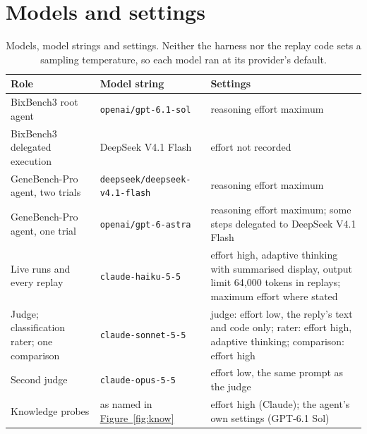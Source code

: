 \documentclass[10pt]{article}
\newcommand{\figref}[1]{\hyperref[#1]{Figure~\ref*{#1}}}
\begin{document}
\section{Models and settings}\label{app:models}
\begin{table}[H]
\centering\small
\caption{Models, model strings and settings. Neither the harness nor the replay code sets a sampling temperature, so each model ran at its provider's default.}
\label{tab:models}
\begin{tabularx}{\textwidth}{@{}P{3.8cm}P{4.0cm}L@{}}
\toprule
Role & Model string & Settings\\
\midrule
BixBench3 root agent & \texttt{openai/gpt-6.1-sol} & reasoning effort maximum\\
BixBench3 delegated execution & DeepSeek V4.1 Flash & effort not recorded\\
GeneBench-Pro agent, two trials & \texttt{deepseek/deepseek-v4.1-flash} & reasoning effort maximum\\
GeneBench-Pro agent, one trial & \texttt{openai/gpt-6-astra} & reasoning effort maximum; some steps delegated to DeepSeek V4.1 Flash\\
Live runs and every replay & \texttt{claude-haiku-5-5} & effort high, adaptive thinking with summarised display, output limit 64,000 tokens in replays; maximum effort where stated\\
Judge; classification rater; one comparison & \texttt{claude-sonnet-5-5} & judge: effort low, the reply's text and code only; rater: effort high, adaptive thinking; comparison: effort high\\
Second judge & \texttt{claude-opus-5-5} & effort low, the same prompt as the judge\\
Knowledge probes & as named in \figref{fig:know} & effort high (Claude); the agent's own settings (GPT-6.1 Sol)\\
\bottomrule
\end{tabularx}
\end{table}
\end{document}
